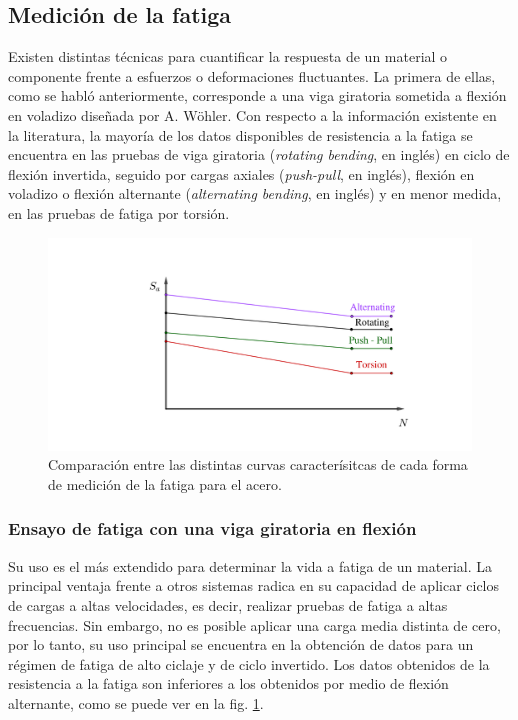 \subsection{Medición de la fatiga}
Existen distintas técnicas para cuantificar la respuesta de un material o componente frente a esfuerzos o deformaciones fluctuantes. La primera de ellas, como se habló anteriormente, corresponde a una viga giratoria sometida a flexión en voladizo diseñada por A. Wöhler. Con respecto a la información existente en la literatura, la mayoría de los datos disponibles de resistencia a la fatiga se encuentra en las pruebas de viga giratoria (\textit{rotating bending}, en inglés) en ciclo de flexión invertida, seguido por cargas axiales (\textit{push-pull}, en inglés), flexión en voladizo o flexión alternante (\textit{alternating bending}, en inglés) y en menor medida, en las pruebas de fatiga por torsión. \cite{norton2011machine}

\begin{figure}[h]
\centering
\includegraphics[width=0.9\linewidth, trim={11cm 2cm 6cm 4cm}, clip]{Imagenes/comp_medfat.pdf}
\caption{Comparación entre las distintas curvas caracterísitcas de cada forma de medición de la fatiga para el acero. \cite{lee2005fatigue}\cite{esin1980method}}
\label{fig:comp_medfat}
\end{figure}


\subsubsection{Ensayo de fatiga con una viga giratoria en flexión} 
Su uso es el más extendido para determinar la vida a fatiga de un material. La principal ventaja frente a otros sistemas radica en su capacidad de aplicar ciclos de cargas a altas velocidades, es decir, realizar pruebas de fatiga a altas frecuencias. Sin embargo, no es posible aplicar una carga media distinta de cero, por lo tanto, su uso principal se encuentra en la obtención de datos para un régimen de fatiga de alto ciclaje y de ciclo invertido. Los datos obtenidos de la resistencia a la fatiga son inferiores a los obtenidos por medio de flexión alternante, como se puede ver en la fig. \ref{fig:comp_medfat}.


